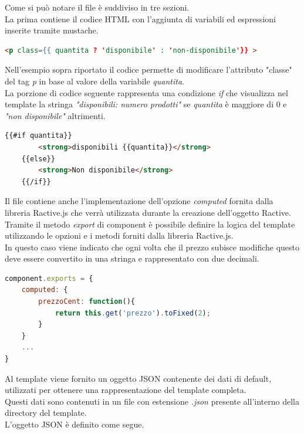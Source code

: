Come si può notare il file è suddiviso in tre sezioni.\\
La prima contiene il codice HTML con l'aggiunta di variabili ed espressioni inserite tramite mustache.

\begin{lstlisting}[language=HTML, caption= Espressione con mustache.]
<p class={{ quantita ? 'disponibile' : 'non-disponibile'}} >
\end{lstlisting}

Nell'esempio sopra riportato il codice permette di modificare l'attributo "classe" del tag \textit{p} in base al valore della variabile \textit{quantita}.\\
La porzione di codice seguente rappresenta una condizione \textit{if} che visualizza nel template la stringa \textit{"disponibili: numero prodotti"} se \textit{quantita} è maggiore di 0 e \textit{"non disponibile"} altrimenti.

\newpage

\begin{lstlisting}[language=HTML, caption=Condizione if-else con mustache.]
	{{#if quantita}}
		<strong>disponibili {{quantita}}</strong>
	{{else}}
		<strong>Non disponibile</strong>
	{{/if}}
\end{lstlisting}

Il file contiene anche l'implementazione dell'opzione \textit{computed} fornita dalla libreria Ractive.js che verrà utilizzata durante la creazione dell'oggetto Ractive.\\
Tramite il metodo \textit{export} di component è possibile definire la logica del template utilizzando le opzioni e i metodi forniti dalla libreria Ractive.js.\\
In questo caso viene indicato che ogni volta che il prezzo subisce modifiche questo deve essere convertito in una stringa e rappresentato con due decimali.

\begin{lstlisting}[language=JavaScript, caption=Implementazione ed esportazione opzione computed.]
component.exports = {
	computed: {
		prezzoCent: function(){
			return this.get('prezzo').toFixed(2);
		}
	}
	...
}
\end{lstlisting}

Al template viene fornito un oggetto JSON contenente dei dati di default, utilizzati per ottenere una rappresentazione del template completa.\\
Questi dati sono contenuti in un file con estensione \textit{.json} presente all'interno della directory del template.\\
L'oggetto JSON è definito come segue.


